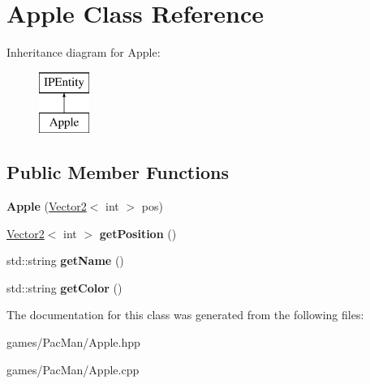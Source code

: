 \hypertarget{class_apple}{}\section{Apple Class Reference}
\label{class_apple}
Inheritance diagram for Apple\+:\begin{figure}[H]
\begin{center}
\leavevmode
\includegraphics[height=2.000000cm]{class_apple}
\end{center}
\end{figure}
\subsection*{Public Member Functions}
\begin{DoxyCompactItemize}
\item 
\mbox{\label{class_apple_af4e679170655408240a317e099f3e1d6}} 
{\bfseries Apple} (\hyperlink{struct_vector2}{Vector2}$<$ int $>$ pos)
\item 
\mbox{\label{class_apple_ad996f13370cbc05c25b60aa870f2aa66}} 
\hyperlink{struct_vector2}{Vector2}$<$ int $>$ {\bfseries get\+Position} ()
\item 
\mbox{\label{class_apple_a394bd2a13137cb232187d1952e100418}} 
std\+::string {\bfseries get\+Name} ()
\item 
\mbox{\label{class_apple_a5a31a10338aa5da199b4bfa91094b15a}} 
std\+::string {\bfseries get\+Color} ()
\end{DoxyCompactItemize}


The documentation for this class was generated from the following files\+:\begin{DoxyCompactItemize}
\item 
games/\+Pac\+Man/Apple.\+hpp\item 
games/\+Pac\+Man/Apple.\+cpp\end{DoxyCompactItemize}
